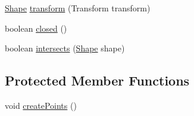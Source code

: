 \begin{DoxyCompactItemize}
\item 
\mbox{\hyperlink{classorg_1_1newdawn_1_1slick_1_1geom_1_1_shape}{Shape}} \mbox{\hyperlink{classorg_1_1newdawn_1_1slick_1_1geom_1_1_line_ac7cb16775d1be4787856682155e872e4}{transform}} (Transform transform)
\item 
boolean \mbox{\hyperlink{classorg_1_1newdawn_1_1slick_1_1geom_1_1_line_aed50a12c5c8a2d860694107c0c126a70}{closed}} ()
\item 
boolean \mbox{\hyperlink{classorg_1_1newdawn_1_1slick_1_1geom_1_1_line_a4a77fb0c2705cbc346a1df83701f39c4}{intersects}} (\mbox{\hyperlink{classorg_1_1newdawn_1_1slick_1_1geom_1_1_shape}{Shape}} shape)
\end{DoxyCompactItemize}
\subsection*{Protected Member Functions}
\begin{DoxyCompactItemize}
\item 
void \mbox{\hyperlink{classorg_1_1newdawn_1_1slick_1_1geom_1_1_line_a3ccc2f47447f307bfcc6b640d03aee9d}{create\+Points}} ()
\end{DoxyCompactItemize}
